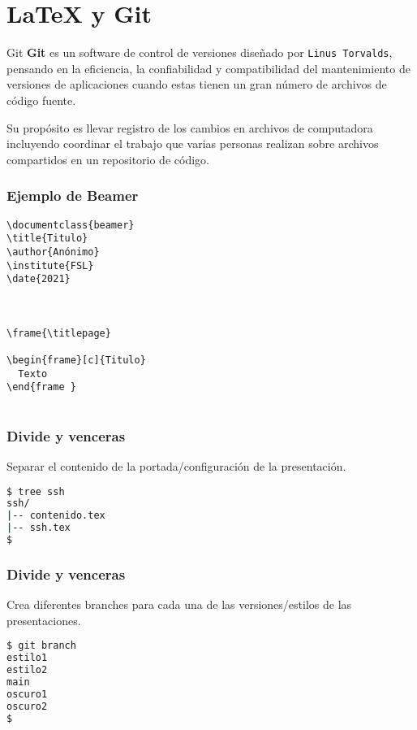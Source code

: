 \section{\LaTeX{} y Git}

\begin{frame}[c]{Git}
  \textbf{Git} es un software de control de versiones diseñado por
  \texttt{Linus Torvalds},
  pensando en la eficiencia, la confiabilidad y compatibilidad del
  mantenimiento de versiones de aplicaciones cuando estas tienen un
  gran número de archivos de código fuente.

  \vspace{\baselineskip}
  Su propósito es llevar registro de los cambios en archivos de computadora
  incluyendo coordinar el trabajo que varias personas realizan sobre archivos
  compartidos en un repositorio de código.
\end{frame}

\begin{frame}[fragile]
  \frametitle{Ejemplo de Beamer}
  \begin{lstlisting}[language={[LaTeX]TeX}]
\documentclass{beamer}
\title{Titulo}
\author{Anónimo}
\institute{FSL}
\date{2021}



\frame{\titlepage}

\begin{frame}[c]{Titulo}
  Texto
\end{frame }


  \end{lstlisting}
\end{frame}

\begin{frame}[fragile]
  \frametitle{Divide y venceras}
  Separar el contenido de la portada/configuración de la presentación.
  \begin{lstlisting}[language=Bash,numbers=none]
$ tree ssh
ssh/
|-- contenido.tex
|-- ssh.tex
$
  \end{lstlisting}
\end{frame}

\begin{frame}[fragile]
  \frametitle{Divide y venceras}
  Crea diferentes branches para cada una de las versiones/estilos de las
  presentaciones.
  \begin{lstlisting}[language=Bash,numbers=none]
$ git branch
estilo1
estilo2
main
oscuro1
oscuro2
$
  \end{lstlisting}
\end{frame}

